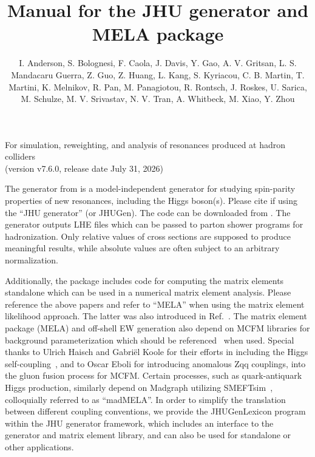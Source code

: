 \documentclass[aps,superscriptaddress,nofootinbib]{revtex4}
\begin{document}
\vspace{0.6cm}

\title{
\large
Manual for the JHU generator and MELA package
}
\author{I. Anderson, S. Bolognesi, F. Caola, J. Davis, Y. Gao, A. V. Gritsan, L. S. Mandacaru Guerra, Z. Guo, Z. Huang, L. Kang, S. Kyriacou, C. B. Martin, T. Martini, K. Melnikov, 
R. Pan, M. Panagiotou, R. Rontsch, J. Roskes, U. Sarica, M. Schulze, M. V. Srivastav, N. V. Tran, A. Whitbeck, M. Xiao, Y. Zhou}
\maketitle
\begin{center}
\small
For simulation, reweighting, and analysis of resonances produced at hadron colliders \\
(version v7.6.0, release date July 31, 2026) \\
\normalsize
\end{center}


\noindent
The generator from \cite{Gao:2010qx,Bolognesi:2012,Anderson:2013,Gritsan:2016hjl,Gritsan:2020pib,Martini:2021uey,Davis:2022} 
is a model-independent generator for studying spin-parity properties of new resonances, including the Higgs boson(s). 
Please cite \cite{Gao:2010qx,Bolognesi:2012,Anderson:2013,Gritsan:2016hjl,Gritsan:2020pib,Martini:2021uey,Davis:2022} 
if using the ``JHU generator'' (or JHUGen). The code can be downloaded from \cite{thesite}.
The generator outputs LHE files which can be passed to parton shower programs for hadronization.
Only relative values of cross sections are supposed to produce meaningful results, 
while absolute values are often subject to an arbitrary normalization.

Additionally, the package includes code for computing the matrix elements standalone which can be used in a numerical matrix element analysis.
Please reference the above papers and refer to ``MELA'' when using the matrix element likelihood approach.
The latter was also introduced in Ref.~\cite{Chatrchyan:2012ufa}. The matrix element package (MELA) and off-shell EW generation 
also depend on MCFM libraries for background parameterization which should be referenced~\cite{Campbell:2010ff} when used. Special thanks to Ulrich Haisch and Gabriël Koole for their efforts in including
the Higgs self-coupling~\cite{SelfCoupling}, and to Oscar Eboli for introducing anomalous Zqq couplings, into the gluon fusion process for MCFM.
Certain processes, such as quark-antiquark Higgs production, similarly depend on Madgraph utilizing SMEFTsim~\cite{SMEFTsim1,SMEFTsim2,Madgraph},
colloquially referred to as ``madMELA''.
In order to simplify the translation between different coupling conventions, we provide the JHUGenLexicon program within the JHU generator framework,
which includes an interface to the generator and matrix element library, and can also be used for standalone or other applications. 
\end{document}
